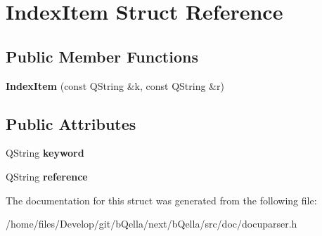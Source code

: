 \hypertarget{structIndexItem}{
\section{IndexItem Struct Reference}
\label{structIndexItem}
}
\subsection*{Public Member Functions}
\begin{DoxyCompactItemize}
\item 
\hypertarget{structIndexItem_a0c10b7965da82ec28db29ef6cf0fb2d6}{
{\bfseries IndexItem} (const QString \&k, const QString \&r)}
\label{structIndexItem_a0c10b7965da82ec28db29ef6cf0fb2d6}

\end{DoxyCompactItemize}
\subsection*{Public Attributes}
\begin{DoxyCompactItemize}
\item 
\hypertarget{structIndexItem_a6080553025afea6ff302c64bfa82975e}{
QString {\bfseries keyword}}
\label{structIndexItem_a6080553025afea6ff302c64bfa82975e}

\item 
\hypertarget{structIndexItem_a2a738f30ad1913da383b89be508220a3}{
QString {\bfseries reference}}
\label{structIndexItem_a2a738f30ad1913da383b89be508220a3}

\end{DoxyCompactItemize}


The documentation for this struct was generated from the following file:\begin{DoxyCompactItemize}
\item 
/home/files/Develop/git/bQella/next/bQella/src/doc/docuparser.h\end{DoxyCompactItemize}
